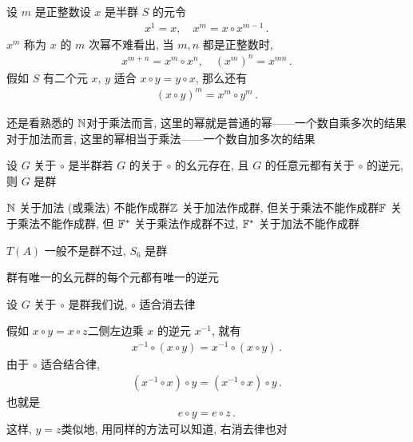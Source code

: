 \begin{definition}
    设 $m$ 是正整数\period 设 $x$ 是半群 $S$ 的元\period 令
    \begin{align*}
        x^{1} = x, \quad x^{m} = x \circ x^{m-1} \period
    \end{align*}
    $x^{m}$ 称为 $x$ 的 $m$ 次幂\period 不难看出, 当 $m,n$ 都是正整数时,
    \begin{align*}
        x^{m+n} = x^m \circ x^n, \quad (x^m)^n = x^{mn} \period
    \end{align*}
    假如 $S$ 有二个元 $x$, $y$ 适合 $x \circ y = y \circ x$, 那么还有
    \begin{align*}
        (x \circ y)^m = x^m \circ y^m \period
    \end{align*}
\end{definition}

\begin{example}
    还是看熟悉的 $\mathbb{N}$\period 对于乘法而言, 这里的幂就是普通的幂——一个数自乘多次的结果\period 对于加法而言, 这里的幂相当于乘法——一个数自加多次的结果\period
\end{example}

\begin{definition}
    设 $G$ 关于 $\circ$ 是半群\period 若 $G$ 的关于 $\circ$ 的幺元存在, 且 $G$ 的任意元都有关于 $\circ$ 的逆元, 则 $G$ 是群 \period
\end{definition}

\begin{example}
    $\mathbb{N}$ 关于加法 (或乘法) 不能作成群\period $\mathbb{Z}$ 关于加法作成群, 但关于乘法不能作成群\period $\mathbb{F}$ 关于乘法不能作成群, 但 $\mathbb{F}^{\ast}$ 关于乘法作成群\period 不过, $\mathbb{F}^{\ast}$ 关于加法不能作成群\period
\end{example}

\begin{example}
    $T(A)$ 一般不是群\period 不过, $S_6$ 是群\period
\end{example}

\begin{remark}
    群有唯一的幺元\period 群的每个元都有唯一的逆元\period
\end{remark}

\begin{remark}
    设 $G$ 关于 $\circ$ 是群\period 我们说, $\circ$ 适合消去律\period

    假如 $x \circ y = x \circ z$\period 二侧左边乘 $x$ 的逆元 $x^{-1}$, 就有
    \begin{align*}
        x^{-1} \circ (x \circ y) = x^{-1} \circ (x \circ y) \period
    \end{align*}
    由于 $\circ$ 适合结合律,
    \begin{align*}
        (x^{-1} \circ x) \circ y = (x^{-1} \circ x) \circ y \period
    \end{align*}
    也就是
    \begin{align*}
        e \circ y = e \circ z \period
    \end{align*}
    这样, $y = z$\period 类似地, 用同样的方法可以知道, 右消去律也对\period
\end{remark}

